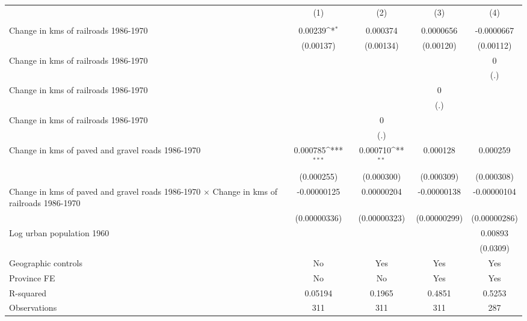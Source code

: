 {
\def\sym#1{\ifmmode^{#1}\else\(^{#1}\)\fi}
\begin{tabular}{l*{4}{c}}
\hline\hline
                &\multicolumn{1}{c}{(1)}&\multicolumn{1}{c}{(2)}&\multicolumn{1}{c}{(3)}&\multicolumn{1}{c}{(4)}\\
                &\multicolumn{1}{c}{}&\multicolumn{1}{c}{}&\multicolumn{1}{c}{}&\multicolumn{1}{c}{}\\
\hline
Change in kms of railroads 1986-1970&  0.00239\sym{*}  & 0.000374         &0.0000656         &-0.0000667         \\
                &(0.00137)         &(0.00134)         &(0.00120)         &(0.00112)         \\
[1em]
Change in kms of railroads 1986-1970&                  &                  &                  &        0         \\
                &                  &                  &                  &      (.)         \\
[1em]
Change in kms of railroads 1986-1970&                  &                  &        0         &                  \\
                &                  &                  &      (.)         &                  \\
[1em]
Change in kms of railroads 1986-1970&                  &        0         &                  &                  \\
                &                  &      (.)         &                  &                  \\
[1em]
Change in kms of paved and gravel roads 1986-1970& 0.000785\sym{***}& 0.000710\sym{**} & 0.000128         & 0.000259         \\
                &(0.000255)         &(0.000300)         &(0.000309)         &(0.000308)         \\
[1em]
Change in kms of paved and gravel roads 1986-1970 $\times$ Change in kms of railroads 1986-1970&-0.00000125         &0.00000204         &-0.00000138         &-0.00000104         \\
                &(0.00000336)         &(0.00000323)         &(0.00000299)         &(0.00000286)         \\
[1em]
Log urban population 1960&                  &                  &                  &  0.00893         \\
                &                  &                  &                  & (0.0309)         \\
\hline
Geographic controls&       No         &      Yes         &      Yes         &      Yes         \\
Province FE     &       No         &       No         &      Yes         &      Yes         \\
R-squared       &  0.05194         &   0.1965         &   0.4851         &   0.5253         \\
Observations    &      311         &      311         &      311         &      287         \\
\hline\hline
\end{tabular}
}
